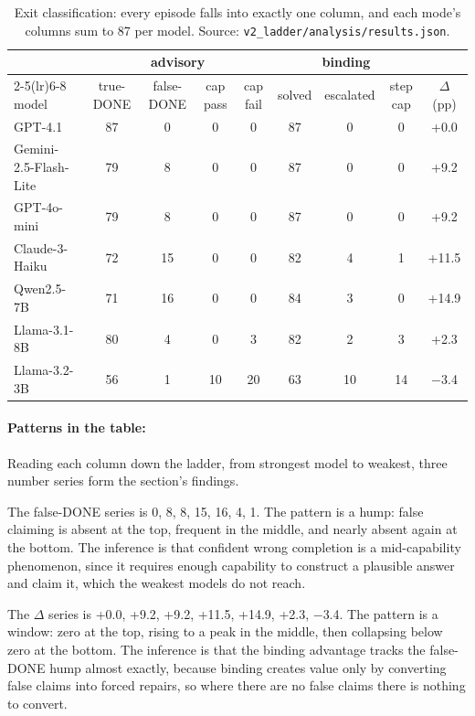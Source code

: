 \begin{table}[H]
\centering
\small
\setlength{\tabcolsep}{4.5pt}
\begin{tabular}{lcccccccc}
\toprule
 & \multicolumn{4}{c}{advisory} & \multicolumn{3}{c}{binding} & \\
\cmidrule(lr){2-5}\cmidrule(lr){6-8}
model & true-DONE & false-DONE & cap pass & cap fail & solved & escalated & step cap & $\Delta$ (pp)\\
\midrule
GPT-4.1 & 87 & 0 & 0 & 0 & 87 & 0 & 0 & +0.0\\
Gemini-2.5-Flash-Lite & 79 & 8 & 0 & 0 & 87 & 0 & 0 & +9.2\\
GPT-4o-mini & 79 & 8 & 0 & 0 & 87 & 0 & 0 & +9.2\\
Claude-3-Haiku & 72 & 15 & 0 & 0 & 82 & 4 & 1 & +11.5\\
Qwen2.5-7B & 71 & 16 & 0 & 0 & 84 & 3 & 0 & +14.9\\
Llama-3.1-8B & 80 & 4 & 0 & 3 & 82 & 2 & 3 & +2.3\\
Llama-3.2-3B & 56 & 1 & 10 & 20 & 63 & 10 & 14 & $-$3.4\\
\bottomrule
\end{tabular}
\caption{Exit classification: every episode falls into exactly one column, and each mode's columns sum to 87 per model. Source: \texttt{v2\_ladder/analysis/results.json}.}
\label{tab:exits}
\end{table}

\paragraph{Patterns in the table:} Reading each column down the ladder, from strongest model to weakest, three number series form the section's findings.

The false-DONE series is 0, 8, 8, 15, 16, 4, 1. The pattern is a hump: false claiming is absent at the top, frequent in the middle, and nearly absent again at the bottom. The inference is that confident wrong completion is a mid-capability phenomenon, since it requires enough capability to construct a plausible answer and claim it, which the weakest models do not reach.

The $\Delta$ series is +0.0, +9.2, +9.2, +11.5, +14.9, +2.3, $-$3.4. The pattern is a window: zero at the top, rising to a peak in the middle, then collapsing below zero at the bottom. The inference is that the binding advantage tracks the false-DONE hump almost exactly, because binding creates value only by converting false claims into forced repairs, so where there are no false claims there is nothing to convert.

